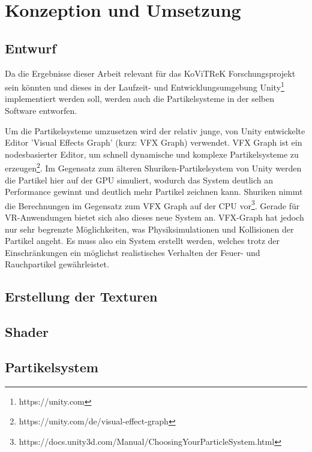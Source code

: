 \section{Konzeption und Umsetzung}
\label{sec:4}
\subsection{Entwurf}

Da die Ergebnisse dieser Arbeit relevant für das KoViTReK Forschungsprojekt sein könnten und dieses in der 
Laufzeit- und Entwicklungsumgebung Unity\footnote{https://unity.com} implementiert werden soll, werden auch die Partikelsysteme in der selben 
Software entworfen. 

Um die Partikelsysteme umzusetzen wird der relativ junge, von Unity entwickelte Editor 'Visual Effects Graph' 
(kurz: VFX Graph) verwendet. VFX Graph ist ein nodesbasierter Editor, um schnell
dynamische und komplexe Partikelsysteme zu erzeugen\footnote{https://unity.com/de/visual-effect-graph}.
Im Gegensatz zum älteren Shuriken-Partikelsystem von Unity werden die Partikel hier auf der GPU
simuliert, wodurch das System deutlich an Performance gewinnt und deutlich mehr Partikel zeichnen kann. 
Shuriken nimmt die Berechnungen im Gegensatz zum VFX Graph auf der CPU vor\footnote{https://docs.unity3d.com/Manual/ChoosingYourParticleSystem.html}. 
Gerade für VR-Anwendungen bietet sich also dieses neue System an.
VFX-Graph hat jedoch nur sehr begrenzte Möglichkeiten, was Physiksimulationen und Kollisionen der Partikel angeht. 
Es muss also ein System erstellt werden, welches trotz der Einschränkungen ein möglichst realistisches Verhalten der Feuer- und Rauchpartikel 
gewährleistet.  


\subsection{Erstellung der Texturen}
\subsection{Shader}

\subsection{Partikelsystem}





\newpage
